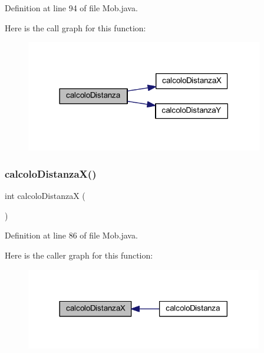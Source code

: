 Definition at line 94 of file Mob.\+java.

Here is the call graph for this function\+:
\nopagebreak
\begin{figure}[H]
\begin{center}
\leavevmode
\includegraphics[width=294pt]{class_entita_1_1_mob_a5b3253014bb1313413c75c8e18fc5f08_cgraph}
\end{center}
\end{figure}
\mbox{\label{class_entita_1_1_mob_a4f271dd5929f9fe1eab650a5b4f08ad1}} 
\subsubsection{\texorpdfstring{calcolo\+Distanza\+X()}{calcoloDistanzaX()}}
{\footnotesize\ttfamily int calcolo\+DistanzaX (\begin{DoxyParamCaption}{ }\end{DoxyParamCaption})}



Definition at line 86 of file Mob.\+java.

Here is the caller graph for this function\+:
\nopagebreak
\begin{figure}[H]
\begin{center}
\leavevmode
\includegraphics[width=293pt]{class_entita_1_1_mob_a4f271dd5929f9fe1eab650a5b4f08ad1_icgraph}
\end{center}
\end{figure}
\mbox{\label{class_entita_1_1_mob_a852bb2aeaf4c181e950c7a81b5d06c32}} 
